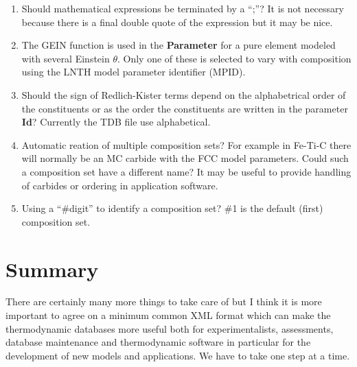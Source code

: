 \documentclass{article}
\begin{document}
\begin{enumerate}
\item Should mathematical expressions be terminated by a ``;''?  It is
  not necessary because there is a final double quote of the expression
  but it may be nice.

\item The GEIN function is used in the {\bf Parameter} for a pure
  element modeled with several Einstein $\theta$.  Only one of these
  is selected to vary with composition using the LNTH model parameter
  identifier (MPID).

\item Should the sign of Redlich-Kister terms depend on the
  alphabetrical order of the constituents or as the order the
  constituents are written in the parameter {\bf Id}?  Currently the
  TDB file use alphabetical.

\item Automatic reation of multiple composition sets?  For example in
  Fe-Ti-C there will normally be an MC carbide with the FCC model
  parameters.  Could such a composition set have a different name?  It
  may be useful to provide handling of carbides or ordering in
  application software.

\item Using a ``\#digit'' to identify a composition set?  \#1 is the
  default (first) composition set.

\end{enumerate}

\section{Summary}

There are certainly many more things to take care of but I think it is
more important to agree on a minimum common XML format which can make
the thermodynamic databases more useful both for experimentalists,
assessments, database maintenance and thermodynamic software in
particular for the development of new models and applications.  We
have to take one step at a time.
\end{document}
